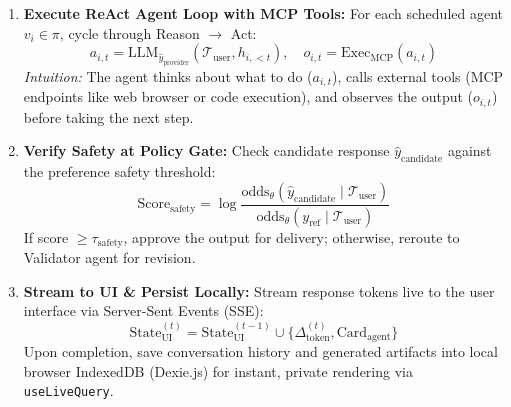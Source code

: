\documentclass[11pt,a4paper]{article}
\begin{document}
\begin{enumerate}[leftmargin=1.5em, itemsep=0.28em, topsep=0.08em]
    \item \textbf{Execute ReAct Agent Loop with MCP Tools:} For each scheduled agent $v_i \in \pi$, cycle through Reason $\rightarrow$ Act:
    \[
    a_{i, t} = \mathrm{LLM}_{\hat{y}_{\text{provider}}}(\mathcal{T}_{\text{user}}, h_{i, <t}), \quad o_{i, t} = \mathrm{Exec}_{\text{MCP}}(a_{i, t})
    \]
    \emph{Intuition:} The agent thinks about what to do ($a_{i,t}$), calls external tools (MCP endpoints like web browser or code execution), and observes the output ($o_{i,t}$) before taking the next step.
    
    \item \textbf{Verify Safety at Policy Gate:} Check candidate response $\hat{y}_{\text{candidate}}$ against the preference safety threshold:
    \[
    \mathrm{Score}_{\text{safety}} = \log \frac{\mathrm{odds}_\theta(\hat{y}_{\text{candidate}} \mid \mathcal{T}_{\text{user}})}{\mathrm{odds}_\theta(y_{\text{ref}} \mid \mathcal{T}_{\text{user}})}
    \]
    If score $\ge \tau_{\text{safety}}$, approve the output for delivery; otherwise, reroute to Validator agent for revision.
    
    \item \textbf{Stream to UI \& Persist Locally:} Stream response tokens live to the user interface via Server-Sent Events (SSE):
    \[
    \text{State}_{\text{UI}}^{(t)} = \text{State}_{\text{UI}}^{(t-1)} \cup \{\Delta_{\text{token}}^{(t)}, \text{Card}_{\text{agent}}\}
    \]
    Upon completion, save conversation history and generated artifacts into local browser IndexedDB (Dexie.js) for instant, private rendering via \texttt{useLiveQuery}.
\end{enumerate}

\newpage

\end{document}
